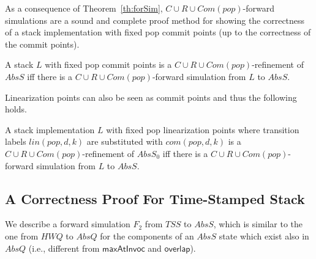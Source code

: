 
As a consequence of Theorem~\ref{th:forSim}, $C\cup R\cup Com(pop)$-forward simulations are a sound and complete proof method for showing the correctness of a stack implementation with fixed pop commit points (up to the correctness of the commit points).


\vspace{-1.5mm}
\begin{corollary}
A stack $L$ with fixed pop commit points is a $C\cup R\cup Com(pop)$-refinement of $AbsS$ if{f} there is a $C\cup R\cup Com(pop)$-forward simulation from $L$ to $AbsS$.
\vspace{-1.5mm}
\end{corollary}

Linearization points can also be seen as commit points and thus the following holds.

\vspace{-1.5mm}
\begin{corollary}
A stack implementation $L$ with fixed pop linearization points where transition labels $lin(pop,d,k)$ are substituted with $com(pop,d,k)$ is a $C\cup R\cup Com(pop)$-refinement of $AbsS_0$ if{f} there is a $C\cup R\cup Com(pop)$-forward simulation from $L$ to $AbsS$.
\vspace{-1.5mm}
\end{corollary}


\vspace{-6mm}
\subsection{A Correctness Proof For Time-Stamped Stack}\label{sec:corr_tss}
\vspace{-1mm}
We describe a forward simulation $F_2$ from $\mathit{TSS}$ to $AbsS$, which is similar to the one from $\mathit{HWQ}$ to $AbsQ$ for the components of an $AbsS$ state which exist also in $AbsQ$ (i.e., different from $\mathsf{maxAtInvoc}$ and $\mathsf{overlap}$).

